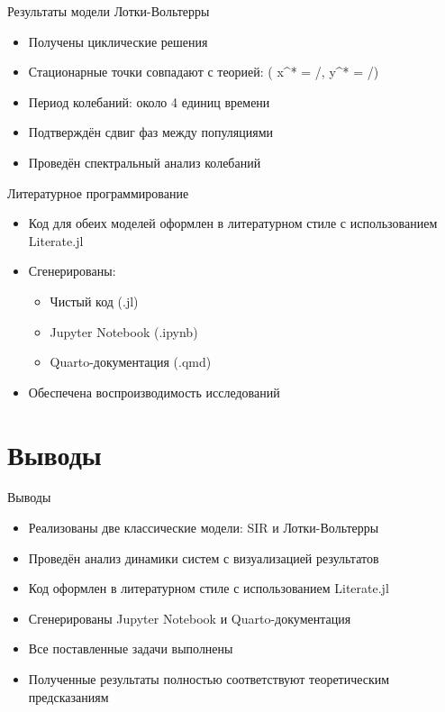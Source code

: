 \documentclass[
  ignorenonframetext,
  aspectratio=169,
  russian,
]{beamer}
\providecommand{\tightlist}{%
  \setlength{\itemsep}{0pt}\setlength{\parskip}{0pt}}\usepackage{longtable,booktabs,array}
\begin{document}
\begin{frame}{Результаты модели Лотки-Вольтерры}
\label{ux440ux435ux437ux443ux43bux44cux442ux430ux442ux44b-ux43cux43eux434ux435ux43bux438-ux43bux43eux442ux43aux438-ux432ux43eux43bux44cux442ux435ux440ux440ux44b-1}
\begin{itemize}[<+->]
\tightlist
\item
  Получены циклические решения
\item
  Стационарные точки совпадают с теорией: ( x\^{}* = \gamma/\delta,
  y\^{}* = \alpha/\beta )
\item
  Период колебаний: около 4 единиц времени
\item
  Подтверждён сдвиг фаз между популяциями
\item
  Проведён спектральный анализ колебаний
\end{itemize}
\end{frame}

\begin{frame}{Литературное программирование}
\label{ux43bux438ux442ux435ux440ux430ux442ux443ux440ux43dux43eux435-ux43fux440ux43eux433ux440ux430ux43cux43cux438ux440ux43eux432ux430ux43dux438ux435}
\begin{itemize}[<+->]
\tightlist
\item
  Код для обеих моделей оформлен в литературном стиле с использованием
  Literate.jl
\item
  Сгенерированы:

  \begin{itemize}[<+->]
  \tightlist
  \item
    Чистый код (.jl)
  \item
    Jupyter Notebook (.ipynb)
  \item
    Quarto-документация (.qmd)
  \end{itemize}
\item
  Обеспечена воспроизводимость исследований
\end{itemize}
\end{frame}

\section{Выводы}\label{ux432ux44bux432ux43eux434ux44b}

\begin{frame}{Выводы}
\label{ux432ux44bux432ux43eux434ux44b-1}
\begin{itemize}[<+->]
\tightlist
\item
  Реализованы две классические модели: SIR и Лотки-Вольтерры
\item
  Проведён анализ динамики систем с визуализацией результатов
\item
  Код оформлен в литературном стиле с использованием Literate.jl
\item
  Сгенерированы Jupyter Notebook и Quarto-документация
\item
  Все поставленные задачи выполнены
\item
  Полученные результаты полностью соответствуют теоретическим
  предсказаниям
\end{itemize}
\end{frame}
\end{document}
